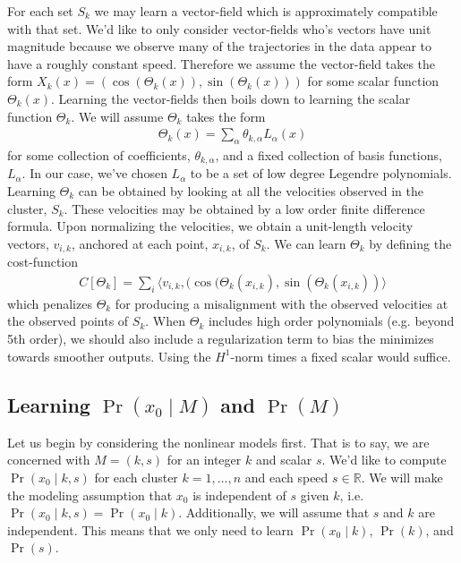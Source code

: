 \documentclass[conference]{IEEEtran}
\begin{document}
  For each set $S_k$ we may learn a vector-field which is approximately compatible with that set.
  We'd like to only consider vector-fields who's vectors have unit magnitude because we observe many of the trajectories in the data appear to have a roughly constant speed.
  Therefore we assume the vector-field takes the form $X_k(x) = \left( \cos( \Theta_k(x) ) , \sin(\Theta_k(x)) \right)$ for some scalar function $\Theta_k(x)$.
  Learning the vector-fields then boils down to learning the scalar function $\Theta_k$.
  We will assume $\Theta_k$ takes the form
  \begin{align*}
  	\Theta_k(x) = \sum_{\alpha} \theta_{k,\alpha} L_{\alpha}(x)
  \end{align*}
  for some collection of coefficients, $\theta_{k,\alpha}$, and a fixed collection of basis functions, $L_{\alpha}$.
  In our case, we've chosen $L_{\alpha}$ to be a set of low degree Legendre polynomials.
  Learning $\Theta_k$ can be obtained by looking at all the velocities observed in the cluster, $S_k$.
  These velocities may be obtained by a low order finite difference formula.
  Upon normalizing the velocities, we obtain a unit-length velocity vectors, $v_{i,k}$, anchored at each point, $x_{i,k}$, of $S_k$.
  We can learn $\Theta_k$ by defining the cost-function
  \begin{align*}
  	C[ \Theta_k] = \sum_i \langle v_{i,k} , ( \cos(\Theta_k( x_{i,k}) , \sin( \Theta_k( x_{i,k} ) ) \rangle
  \end{align*}
  which penalizes $\Theta_k$ for producing a misalignment with the observed velocities at the observed points of $S_k$.
  When $\Theta_{k}$ includes high order polynomials (e.g. beyond 5th order), we should also include a regularization term to bias the minimizes towards smoother outputs.
  Using the $H^1$-norm times a fixed scalar would suffice.
  
  
  \subsection{Learning $\Pr( x_0 \mid M)$ and $\Pr(M)$}
  Let us begin by considering the nonlinear models first.
  That is to say, we are concerned with $M = (k,s)$ for an integer $k$ and scalar $s$.
  We'd like to compute $\Pr( x_0 \mid k,s)$ for each cluster $k=1,\dots,n$ and each speed $s \in \mathbb{R}$.
  We will make the modeling assumption that $x_0$ is independent of $s$ given $k$, i.e. $\Pr( x_0 \mid k,s) = \Pr(x_0 \mid k)$.
  Additionally, we will assume that $s$ and $k$ are independent.
  This means that we only need to learn $\Pr( x_0 \mid k)$, $\Pr(k)$, and $\Pr(s)$.
  
\end{document}
